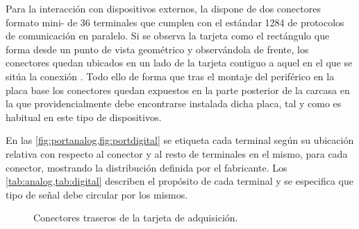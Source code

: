 Para la interacción con dispositivos externos, la \kpci{} dispone de dos conectores formato mini- de 36 terminales que cumplen con el estándar  1284 de protocolos de comunicación en paralelo. Si se observa la tarjeta como el rectángulo que forma desde un punto de vista geométrico y observándola de frente, los conectores quedan ubicados en un lado de la tarjeta contiguo a aquel en el que se sitúa la conexión . Todo ello de forma que tras el montaje del periférico en la placa base los conectores quedan expuestos en la parte posterior de la carcasa en la que providencialmente debe encontrarse instalada dicha placa, tal y como es habitual en este tipo de dispositivos.\par
En las \cref{fig:portanalog,fig:portdigital} se etiqueta cada terminal según su ubicación relativa con respecto al conector y al resto de terminales en el mismo, para cada conector, mostrando la distribución definida por el fabricante. Los \cref{tab:analog,tab:digital} describen el propósito de cada terminal y se especifica que tipo de señal debe circular por los mismos.

\begin{figure}
	\begin{center}
			\vspace*{.1\textheight}
	\end{center}
	\caption[Conectores traseros de la tarjeta de adquisición]{Conectores traseros de la tarjeta de adquisición.}
	\label{fig:ports}
\end{figure}

\newlength\tablewidth
\setlength{}

